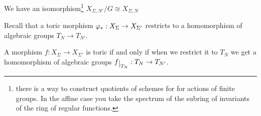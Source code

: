 \begin{fact}[]
We have an isomorphism\footnote{there is a way to construct quotients of schemes for for actions of finite groups. In the affine case you take the spectrum of the subring of invariants of the ring of regular functions.} $X_{\Sigma,N'}/G\cong X_{\Sigma,N}$
\end{fact}






Recall that a toric morphism $\varphi_\ast:X_{\Sigma}\to X_{\Sigma'}$ restricts to a homomorphism of algebraic groups $T_N\to T_{N'}$.

\begin{theorem}[]\label{ThCharacterizationOfToricMorphisms}
A morphism $f:X_{\Sigma}\to X_{\Sigma'}$ is toric if and only if when we restrict it to ${T_N}$ we get a homomorphism of algebraic groups $f\res{T_N}:T_N\to T_{N'}$.
\end{theorem}
